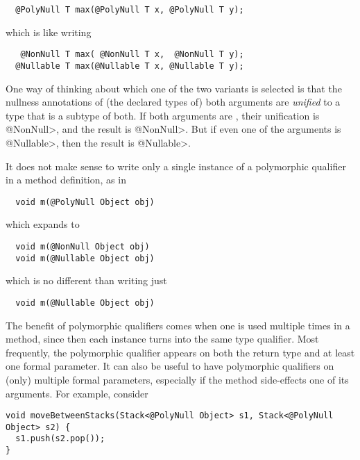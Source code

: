 \begin{Verbatim}
  @PolyNull T max(@PolyNull T x, @PolyNull T y);
\end{Verbatim}

\noindent
which is like writing

\begin{Verbatim}
   @NonNull T max( @NonNull T x,  @NonNull T y);
  @Nullable T max(@Nullable T x, @Nullable T y);
\end{Verbatim}

\noindent
One way of thinking about which one of the two  variants is
selected is that the nullness annotations of (the declared types of) both
arguments are \emph{unified} to a type that is a subtype of both.  If both
arguments are , their unification is \<@NonNull>, and the
result is \<@NonNull>.  But if even one of the arguments is \<@Nullable>,
then the result is \<@Nullable>.



It does not make sense to write only a single instance of a polymorphic
qualifier in a method definition, as in

\begin{Verbatim}
  void m(@PolyNull Object obj)
\end{Verbatim}

\noindent
which expands to

\begin{Verbatim}
  void m(@NonNull Object obj)
  void m(@Nullable Object obj)
\end{Verbatim}

\noindent
which is no different than writing just

\begin{Verbatim}
  void m(@Nullable Object obj)
\end{Verbatim}

\noindent
The benefit of polymorphic qualifiers comes when one is used multiple times
in a method, since then each instance turns into the same type qualifier.
Most frequently, the polymorphic qualifier appears on both the return type
and at least one formal parameter.  It can also be useful to have
polymorphic qualifiers on (only) multiple formal parameters, especially if
the method side-effects one of its arguments.
For example, consider

\begin{Verbatim}
void moveBetweenStacks(Stack<@PolyNull Object> s1, Stack<@PolyNull Object> s2) {
  s1.push(s2.pop());
}
\end{Verbatim}

